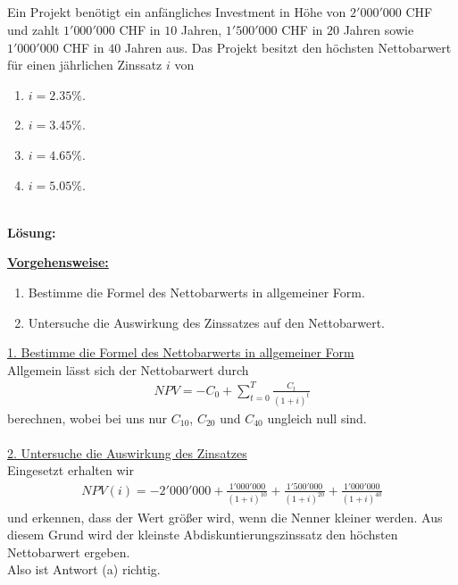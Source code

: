 \newpage

\subsection*{}
Ein Projekt benötigt ein anfängliches Investment in Höhe von $2'000'000$ CHF
und zahlt $1'000'000$ CHF in $10$ Jahren, $1'500'000$ CHF in $20$ Jahren sowie $1'000'000$ CHF in $40$ Jahren aus.
Das Projekt besitzt den höchsten Nettobarwert für einen jährlichen Zinssatz $i$ von
\renewcommand{\labelenumi}{(\alph{enumi})}
\begin{enumerate}
\item $i = 2.35 \%$.
\item $i = 3.45 \%$.
\item $i = 4.65 \%$.
\item $i = 5.05 \%$.
\end{enumerate}

\ \\
\textbf{Lösung:}
\begin{mdframed}
\underline{\textbf{Vorgehensweise:}}
\renewcommand{\labelenumi}{\theenumi.}
\begin{enumerate}
\item Bestimme die Formel des Nettobarwerts in allgemeiner Form.
\item Untersuche die Auswirkung des Zinssatzes auf den Nettobarwert. 
\end{enumerate}
\end{mdframed}

\underline{1. Bestimme die Formel des Nettobarwerts in allgemeiner Form}\\
Allgemein lässt sich der Nettobarwert durch
\begin{align*}
NPV =
-C_0 + \sum \limits_{t=0}^T \frac{C_t}{(1+i)^t}
\end{align*}
berechnen, wobei bei uns nur $C_{10}$, $C_{20}$ und $C_{40}$ ungleich null sind.
\\
\\

\underline{2. Untersuche die Auswirkung des Zinsatzes}\\
Eingesetzt erhalten wir
\begin{align*}
NPV(i) 
= 
-2'000'000 + \frac{1'000'000}{(1+i)^{10}} + \frac{1'500'000}{(1+i)^{20}}
+ \frac{1'000'000}{(1+i)^{40}}
\end{align*}
und erkennen, dass der Wert größer wird, wenn die Nenner kleiner werden.
Aus diesem Grund wird der kleinste Abdiskuntierungszinssatz
den höchsten Nettobarwert ergeben.\\
Also ist Antwort (a) richtig.

